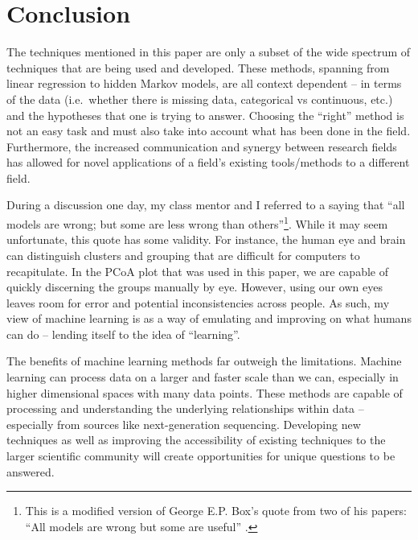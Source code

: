 \documentclass[12pt,openany]{book}
\let\rmarkdownfootnote\footnote%
\def\footnote{\protect\rmarkdownfootnote}
\begin{document}
\chapter{Conclusion}\label{con}

The techniques mentioned in this paper are only a subset of the wide
spectrum of techniques that are being used and developed. These methods,
spanning from linear regression to hidden Markov models, are all context
dependent -- in terms of the data (i.e.~whether there is missing data,
categorical vs continuous, etc.) and the hypotheses that one is trying
to answer. Choosing the ``right'' method is not an easy task and must
also take into account what has been done in the field. Furthermore, the
increased communication and synergy between research fields has allowed
for novel applications of a field's existing tools/methods to a
different field.

During a discussion one day, my class mentor and I referred to a saying
that ``all models are wrong; but some are less wrong than
others''\footnote{This is a modified version of George E.P. Box's quote
  from two of his papers: ``All models are wrong but some are useful''
  \citep{box1976science, box1979robustness}.}. While it may seem
unfortunate, this quote has some validity. For instance, the human eye
and brain can distinguish clusters and grouping that are difficult for
computers to recapitulate. In the PCoA plot that was used in this paper,
we are capable of quickly discerning the groups manually by eye.
However, using our own eyes leaves room for error and potential
inconsistencies across people. As such, my view of machine learning is
as a way of emulating and improving on what humans can do -- lending
itself to the idea of ``learning''.

The benefits of machine learning methods far outweigh the limitations.
Machine learning can process data on a larger and faster scale than we
can, especially in higher dimensional spaces with many data points.
These methods are capable of processing and understanding the underlying
relationships within data -- especially from sources like
next-generation sequencing. Developing new techniques as well as
improving the accessibility of existing techniques to the larger
scientific community will create opportunities for unique questions to
be answered.


\end{document}
